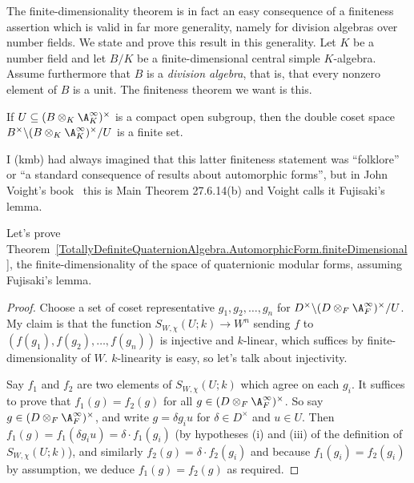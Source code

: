 The finite-dimensionality theorem is in fact an easy consequence of a finiteness assertion
which is valid in far more generality, namely for division algebras over number fields.
We state and prove this result in this generality. Let $K$ be a number field and let $B/K$
be a finite-dimensional central simple $K$-algebra. Assume furthermore that $B$ is a
\emph{division algebra}, that is, that every nonzero element of $B$ is a unit. The finiteness
theorem we want is this.

\begin{theorem}
  \label{FiniteAdeleRing.DivisionAlgebra.finiteDoubleCoset}
  If $U\subseteq (B\otimes_K\A_K^\infty)^\times$ is a compact open subgroup,
  then the double coset space $B^\times\backslash(B\otimes_K\A_K^\infty)^\times/U$ is a
  finite set.
\end{theorem}

I (kmb) had always imagined that this latter finiteness statement was ``folklore'' or
``a standard consequence of results about automorphic forms'', but in John Voight's
book~\cite{voightbook} this is Main Theorem 27.6.14(b) and Voight calls it Fujisaki’s lemma.

Let's prove Theorem~\ref{TotallyDefiniteQuaternionAlgebra.AutomorphicForm.finiteDimensional},
the finite-dimensionality of the space of quaternionic modular forms,
assuming Fujisaki's lemma.
\begin{proof}
  Choose a set of coset representative $g_1,g_2,\ldots,g_n$ for
  $D^\times\backslash(D\otimes_F\A_F^\infty)^\times/U$. My claim is that
  the function $S_{W,\chi}(U;k)\to W^n$ sending $f$ to $(f(g_1),f(g_2),\ldots,f(g_n))$
  is injective and $k$-linear, which suffices by finite-dimensionality of $W$.
  $k$-linearity is easy, so let's talk about injectivity.

  Say $f_1$ and $f_2$ are two elements of $S_{W,\chi}(U;k)$ which agree on
  each $g_i$. It suffices to prove that $f_1(g)=f_2(g)$ for all
  $g\in(D\otimes_F\A_F^\infty)^\times$. So say $g\in(D\otimes_F\A_F^\infty)^\times$,
  and write $g=\delta g_iu$ for $\delta \in D^\times$ and $u\in U$.
  Then $f_1(g)=f_1(\delta g_iu)=\delta\cdot f_1(g_i)$ (by hypotheses (i) and (iii)
  of the definition of $S_{W,\chi}(U;k)$), and similarly $f_2(g)=\delta\cdot f_2(g_i)$
  and because $f_1(g_i)=f_2(g_i)$ by assumption, we deduce $f_1(g)=f_2(g)$ as required.
\end{proof}

